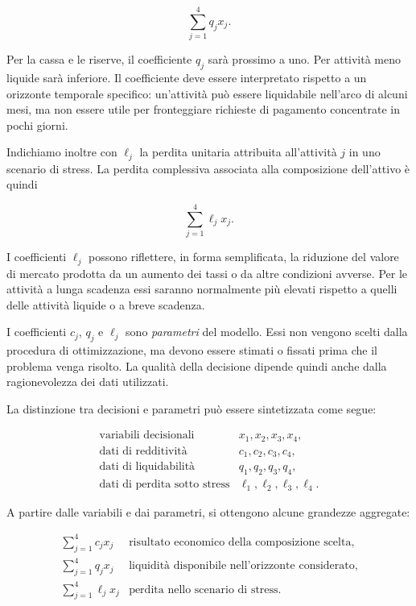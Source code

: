 \[
\sum_{j=1}^{4}q_jx_j.
\]

Per la cassa e le riserve, il coefficiente $q_j$ sar\`a prossimo a uno. Per
attivit\`a meno liquide sar\`a inferiore. Il coefficiente deve essere
interpretato rispetto a un orizzonte temporale specifico: un'attivit\`a pu\`o
essere liquidabile nell'arco di alcuni mesi, ma non essere utile per
fronteggiare richieste di pagamento concentrate in pochi giorni.

Indichiamo inoltre con $\ell_j$ la perdita unitaria attribuita all'attivit\`a
$j$ in uno scenario di stress. La perdita complessiva associata alla
composizione dell'attivo \`e quindi

\[
\sum_{j=1}^{4}\ell_jx_j.
\]

I coefficienti $\ell_j$ possono riflettere, in forma semplificata, la
riduzione del valore di mercato prodotta da un aumento dei tassi o da altre
condizioni avverse. Per le attivit\`a a lunga scadenza essi saranno
normalmente pi\`u elevati rispetto a quelli delle attivit\`a liquide o a breve
scadenza.

I coefficienti $c_j$, $q_j$ e $\ell_j$ sono \emph{parametri} del modello.
Essi non vengono scelti dalla procedura di ottimizzazione, ma devono essere
stimati o fissati prima che il problema venga risolto. La qualit\`a della
decisione dipende quindi anche dalla ragionevolezza dei dati utilizzati.

La distinzione tra decisioni e parametri pu\`o essere sintetizzata come segue:

\[
\begin{array}{ll}
\text{variabili decisionali}
&
x_1,x_2,x_3,x_4,
\\[4pt]
\text{dati di redditivit\`a}
&
c_1,c_2,c_3,c_4,
\\[4pt]
\text{dati di liquidabilit\`a}
&
q_1,q_2,q_3,q_4,
\\[4pt]
\text{dati di perdita sotto stress}
&
\ell_1,\ell_2,\ell_3,\ell_4.
\end{array}
\]

A partire dalle variabili e dai parametri, si ottengono alcune grandezze
aggregate:

\[
\begin{array}{ll}
\displaystyle\sum_{j=1}^{4}c_jx_j
&
\text{risultato economico della composizione scelta},
\\[10pt]
\displaystyle\sum_{j=1}^{4}q_jx_j
&
\text{liquidit\`a disponibile nell'orizzonte considerato},
\\[10pt]
\displaystyle\sum_{j=1}^{4}\ell_jx_j
&
\text{perdita nello scenario di stress}.
\end{array}
\]

